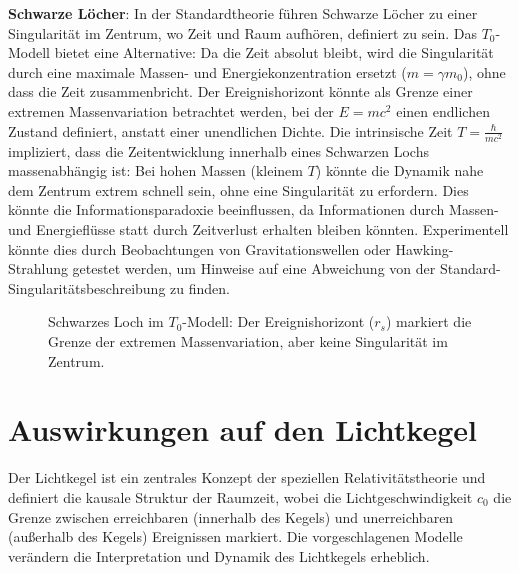\documentclass[a4paper,12pt]{article}
\begin{document}
	\textbf{Schwarze Löcher}: In der Standardtheorie führen Schwarze Löcher zu einer Singularität im Zentrum, wo Zeit und Raum aufhören, definiert zu sein. Das \( T_0 \)-Modell bietet eine Alternative: Da die Zeit absolut bleibt, wird die Singularität durch eine maximale Massen- und Energiekonzentration ersetzt (\( m = \gamma m_0 \)), ohne dass die Zeit zusammenbricht. Der Ereignishorizont könnte als Grenze einer extremen Massenvariation betrachtet werden, bei der \( E = m c^2 \) einen endlichen Zustand definiert, anstatt einer unendlichen Dichte. Die intrinsische Zeit \( T = \frac{\hbar}{m c^2} \) impliziert, dass die Zeitentwicklung innerhalb eines Schwarzen Lochs massenabhängig ist: Bei hohen Massen (kleinem \( T \)) könnte die Dynamik nahe dem Zentrum extrem schnell sein, ohne eine Singularität zu erfordern. Dies könnte die Informationsparadoxie beeinflussen, da Informationen durch Massen- und Energieflüsse statt durch Zeitverlust erhalten bleiben könnten. Experimentell könnte dies durch Beobachtungen von Gravitationswellen oder Hawking-Strahlung getestet werden, um Hinweise auf eine Abweichung von der Standard-Singularitätsbeschreibung zu finden.
	
	\begin{figure}[h]
		\centering
		\caption{Schwarzes Loch im $T_0$-Modell: Der
			 Ereignishorizont ($r_s$) markiert die Grenze der extremen Massenvariation, aber keine Singularität im Zentrum.}
			\end{figure}
			
			\section{Auswirkungen auf den Lichtkegel}
			Der Lichtkegel ist ein zentrales Konzept der speziellen Relativitätstheorie und definiert die kausale Struktur der Raumzeit, wobei die Lichtgeschwindigkeit \( c_0 \) die Grenze zwischen erreichbaren (innerhalb des Kegels) und unerreichbaren (außerhalb des Kegels) Ereignissen markiert. Die vorgeschlagenen Modelle verändern die Interpretation und Dynamik des Lichtkegels erheblich.
			
\end{document}
